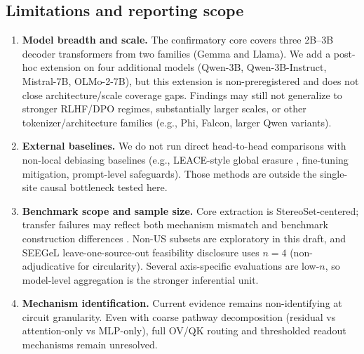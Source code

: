 \subsection{Limitations and reporting scope}
\label{sec:limitations-appendix}
\begin{enumerate}[leftmargin=*]
  \item \textbf{Model breadth and scale.} The confirmatory core covers three 2B--3B decoder transformers from two families (Gemma and Llama). We add a post-hoc extension on four additional models (Qwen-3B, Qwen-3B-Instruct, Mistral-7B, OLMo-2-7B), but this extension is non-preregistered and does not close architecture/scale coverage gaps. Findings may still not generalize to stronger RLHF/DPO regimes, substantially larger scales, or other tokenizer/architecture families (e.g., Phi, Falcon, larger Qwen variants).
  \item \textbf{External baselines.} We do not run direct head-to-head comparisons with non-local debiasing baselines (e.g., LEACE-style global erasure \citep{belrose2023leace}, fine-tuning mitigation, prompt-level safeguards). Those methods are outside the single-site causal bottleneck tested here.
  \item \textbf{Benchmark scope and sample size.} Core extraction is StereoSet-centered; transfer failures may reflect both mechanism mismatch and benchmark construction differences \citep{blodgett2021salmon}. Non-US subsets are exploratory in this draft, and SEEGeL leave-one-source-out feasibility disclosure uses $n=4$ (non-adjudicative for circularity). Several axis-specific evaluations are low-$n$, so model-level aggregation is the stronger inferential unit.
\item \textbf{Mechanism identification.} Current evidence remains non-identifying at circuit granularity. Even with coarse pathway decomposition (residual vs attention-only vs MLP-only), full OV/QK routing and thresholded readout mechanisms remain unresolved.
\end{enumerate}

